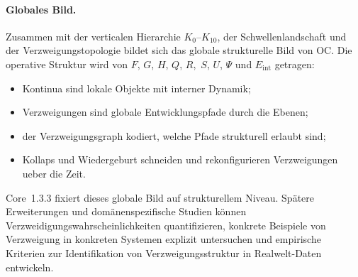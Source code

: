\paragraph{Globales Bild.}
Zusammen mit der verticalen Hierarchie \(K_0\)–\(K_{10}\), der
Schwellenlandschaft und der Verzweigungstopologie bildet sich das globale
strukturelle Bild von OC.
Die operative Struktur wird von \(F\), \(G\), \(H\), \(Q\), \(R\),\
\(S\), \(U\), \(\Psi\) und \(E_{\mathrm{int}}\) getragen:
\begin{itemize}
  \item Kontinua sind lokale Objekte mit interner Dynamik;
  \item Verzweigungen sind globale Entwicklungspfade durch die Ebenen;
  \item der Verzweigungsgraph kodiert, welche Pfade strukturell erlaubt sind;
  \item Kollaps und Wiedergeburt schneiden und rekonfigurieren Verzweigungen
        ueber die Zeit.
\end{itemize}

Core~1.3.3 fixiert dieses globale Bild auf strukturellem Niveau. Spätere Erweiterungen
und domänenspezifische Studien können Verzweidigungswahrscheinlichkeiten
quantifizieren, konkrete Beispiele von Verzweigung in konkreten Systemen explizit
untersuchen und empirische Kriterien zur Identifikation von Verzweigungsstruktur
in Realwelt-Daten entwickeln.

